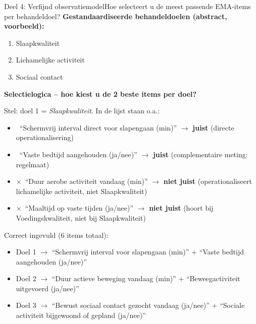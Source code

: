 \documentclass[11pt,a4paper]{article}
\begin{document}
\begin{voorbeeldbox}{Deel 4: Verfijnd observatiemodel}{Hoe selecteert u de meest passende EMA-items per behandeldoel?}
\small
\textbf{Gestandaardiseerde behandeldoelen (abstract, voorbeeld):}
\begin{enumerate}[topsep=2pt,itemsep=1pt,label=\arabic*.]
\item Slaapkwaliteit
\item Lichamelijke activiteit
\item Sociaal contact
\end{enumerate}

\textbf{Selectielogica -- hoe kiest u de 2 beste items per doel?}

Stel: doel 1 = \textit{Slaapkwaliteit}. In de lijst staan o.a.:
\begin{itemize}[topsep=2pt,itemsep=1pt]
\item \checkmark\ ``Schermvrij interval direct voor slapengaan (min)'' $\rightarrow$ \textbf{juist} (directe operationalisering)
\item \checkmark\ ``Vaste bedtijd aangehouden (ja/nee)'' $\rightarrow$ \textbf{juist} (complementaire meting: regelmaat)
\item $\times$\ ``Duur aerobe activiteit vandaag (min)'' $\rightarrow$ \textbf{niet juist} (operationaliseert lichamelijke activiteit, niet Slaapkwaliteit)
\item $\times$\ ``Maaltijd op vaste tijden (ja/nee)'' $\rightarrow$ \textbf{niet juist} (hoort bij Voedingskwaliteit, niet bij Slaapkwaliteit)
\end{itemize}

\medskip
Correct ingevuld (6 items totaal):
\begin{itemize}[topsep=1pt,itemsep=0pt]
\item Doel 1 $\rightarrow$ ``Schermvrij interval voor slapengaan (min)'' + ``Vaste bedtijd aangehouden (ja/nee)''
\item Doel 2 $\rightarrow$ ``Duur actieve beweging vandaag (min)'' + ``Beweegactiviteit uitgevoerd (ja/nee)''
\item Doel 3 $\rightarrow$ ``Bewust sociaal contact gezocht vandaag (ja/nee)'' + ``Sociale activiteit bijgewoond of gepland (ja/nee)''
\end{itemize}
\end{voorbeeldbox}

\vspace{0.5em}
\end{document}
